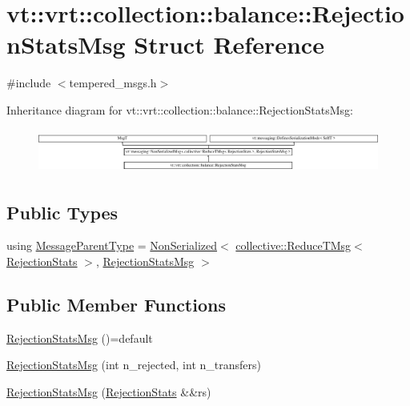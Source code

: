\hypertarget{structvt_1_1vrt_1_1collection_1_1balance_1_1_rejection_stats_msg}{}\section{vt\+:\+:vrt\+:\+:collection\+:\+:balance\+:\+:Rejection\+Stats\+Msg Struct Reference}
\label{structvt_1_1vrt_1_1collection_1_1balance_1_1_rejection_stats_msg}


{\ttfamily \#include $<$tempered\+\_\+msgs.\+h$>$}

Inheritance diagram for vt\+:\+:vrt\+:\+:collection\+:\+:balance\+:\+:Rejection\+Stats\+Msg\+:\begin{figure}[H]
\begin{center}
\leavevmode
\includegraphics[height=1.455806cm]{structvt_1_1vrt_1_1collection_1_1balance_1_1_rejection_stats_msg}
\end{center}
\end{figure}
\subsection*{Public Types}
\begin{DoxyCompactItemize}
\item 
using \hyperlink{structvt_1_1vrt_1_1collection_1_1balance_1_1_rejection_stats_msg_aca2b6f9df74d05aa680f695b14e49133}{Message\+Parent\+Type} = \hyperlink{namespacevt_a378e4a02213923b4ba1c3f9d2a1424c7}{Non\+Serialized}$<$ \hyperlink{namespacevt_1_1collective_a28b82d5d48c9bc6e4fd738fcbf9e0f62}{collective\+::\+Reduce\+T\+Msg}$<$ \hyperlink{structvt_1_1vrt_1_1collection_1_1balance_1_1_rejection_stats}{Rejection\+Stats} $>$, \hyperlink{structvt_1_1vrt_1_1collection_1_1balance_1_1_rejection_stats_msg}{Rejection\+Stats\+Msg} $>$
\end{DoxyCompactItemize}
\subsection*{Public Member Functions}
\begin{DoxyCompactItemize}
\item 
\hyperlink{structvt_1_1vrt_1_1collection_1_1balance_1_1_rejection_stats_msg_ad24397c9e14f52bb58249ca7e5b44b6a}{Rejection\+Stats\+Msg} ()=default
\item 
\hyperlink{structvt_1_1vrt_1_1collection_1_1balance_1_1_rejection_stats_msg_a46fddbf480820f53770afa464e4718c2}{Rejection\+Stats\+Msg} (int n\+\_\+rejected, int n\+\_\+transfers)
\item 
\hyperlink{structvt_1_1vrt_1_1collection_1_1balance_1_1_rejection_stats_msg_aa23b148a1cc09f1c5f2ff9affd2f940a}{Rejection\+Stats\+Msg} (\hyperlink{structvt_1_1vrt_1_1collection_1_1balance_1_1_rejection_stats}{Rejection\+Stats} \&\&rs)
\end{DoxyCompactItemize}
